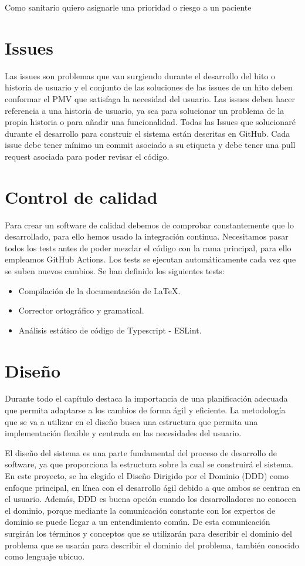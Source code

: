 Como sanitario quiero asignarle una prioridad o riesgo a un paciente

\section{Issues}
Las issues son problemas que van surgiendo durante el desarrollo del hito o historia de usuario y
el conjunto de las soluciones de las issues de un hito deben conformar el PMV que satisfaga la necesidad del usuario.
Las issues deben hacer referencia a una historia de usuario, ya sea para solucionar un problema de la propia historia o para añadir una funcionalidad.
Todas las Issues que solucionaré durante el desarrollo para construir el sistema están descritas en GitHub. Cada issue debe tener mínimo un commit asociado a su
etiqueta y debe tener una pull request asociada para poder revisar el código.

\section{Control de calidad}
\label{sc:control-calidad}
Para crear un software de calidad debemos de comprobar constantemente que lo desarrollado, para ello hemos usado la integración continua.
Necesitamos pasar todos los tests antes de poder mezclar el código con la rama principal, para ello empleamos GitHub Actions.
Los tests se ejecutan automáticamente cada vez que se suben nuevos cambios. Se han definido los siguientes tests:

\begin{itemize}
    \item{Compilación de la documentación de LaTeX.}
    \item{Corrector ortográfico y gramatical.}
    \item{Análisis estático de código de Typescript - ESLint.}
\end{itemize}

\section{Diseño}
\label{sc:diseño}
Durante todo el capítulo destaca la importancia de una planificación adecuada que permita adaptarse a los cambios de forma ágil y eficiente.
La metodología que se va a utilizar en el diseño busca una estructura que permita una implementación flexible y centrada en las necesidades del usuario.

El diseño del sistema es una parte fundamental del proceso de desarrollo de software, ya que proporciona la estructura sobre la cual se construirá el sistema.
En este proyecto, se ha elegido el Diseño Dirigido por el Dominio (DDD) \cite{domain-drive-design} como enfoque principal, en línea con el desarrollo ágil debido a que ambos se centran en el usuario.
Además, DDD es buena opción cuando los desarrolladores no conocen el dominio, porque mediante la comunicación constante con los expertos de dominio se puede llegar a un entendimiento común.
De esta comunicación surgirán los términos y conceptos que se utilizarán para describir el dominio del problema que se usarán para describir el dominio del problema, también conocido como lenguaje ubicuo.

